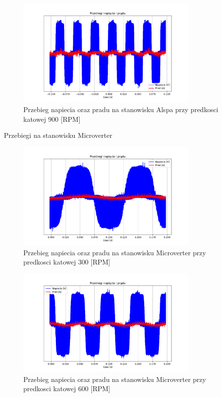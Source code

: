 \documentclass[11pt]{article}
\begin{document}
\begin{figure}[H]
\centering
\includegraphics[width=0.8\textwidth]{aun1_alspa_rpm900.pdf}
\caption{Przebieg napiecia oraz pradu na stanowisku Alspa przy predkosci katowej 900 [RPM]}
\end{figure}

Przebiegi na stanowisku Microverter

\begin{figure}[H]
\centering
\includegraphics[width=0.8\textwidth]{aun1_microverter_rpm300.pdf}
\caption{Przebieg napiecia oraz pradu na stanowisku Microverter przy predkosci katowej 300 [RPM]}
\end{figure}

\begin{figure}[H]
\centering
\includegraphics[width=0.8\textwidth]{aun1_microverter_rpm600.pdf}
\caption{Przebieg napiecia oraz pradu na stanowisku Microverter przy predkosci katowej 600 [RPM]}
\end{figure}
\end{document}

